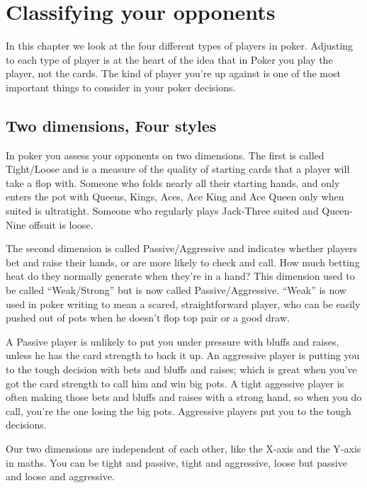 \chapter{Classifying your opponents}


In this chapter we look at the four different types of players in
poker. Adjusting to each type of player is at the heart of the idea
that in Poker you play the player, not the cards. The kind of player
you're up against is one of the most important things to consider in
your poker decisions.

\section{Two dimensions, Four styles}

In poker you assess your opponents on two dimensions.
The first is called Tight/Loose and is a measure of the quality
of starting cards that a player will take a flop with. Someone
who folds nearly all their starting hands, and
only enters the pot with Queens, Kings, Aces, Ace King and
Ace Queen only when suited is ultratight. Someone who regularly plays
Jack-Three suited and Queen-Nine offsuit is loose.

The second dimension is called Passive/Aggressive and indicates
whether players bet and raise their hands, or are more likely
to check and call. How much betting heat do they normally generate
when they're in a hand? This dimension used to be called ``Weak/Strong''
but is now called Passive/Aggressive. ``Weak'' is now used in poker
writing to mean a scared, straightforward player, who can be
easily pushed out of pots when he doesn't flop top pair or a good
draw.

A Passive player is unlikely to put you under pressure with bluffs and
raises, unless he has the card strength to back it up. An aggressive
player is putting you to the tough decision with bets and bluffs and
raises; which is great when you've got the card strength to call him
and win big pots. A tight aggessive player is often making those bets and
bluffs and raises with a strong hand, so when you do call, you're
the one losing the big pots. Aggressive players put you to the tough
decisions.

Our two dimensions are independent of each other, like the X-axis
and the Y-axis in maths. You can be tight and passive, tight
and aggressive, loose but passive and loose and aggressive.

